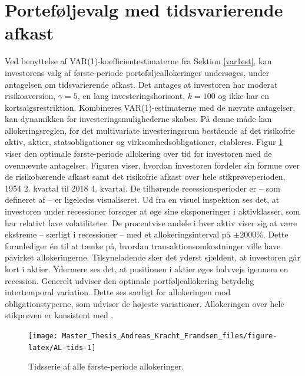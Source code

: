 \documentclass[
  a4paper,
  oneside]{memoir}
\begin{document}
\hypertarget{portvalgmedtids}{%
\section{Porteføljevalg med tidsvarierende afkast}\label{portvalgmedtids}}

Ved benyttelse af VAR(1)-koefficientestimaterne fra Sektion \ref{var1est}, kan investorens valg af første-periode porteføljeallokeringer undersøges, under antagelsen om tidsvarierende afkast. Det antages at investoren har moderat risikoaversion, \(\gamma=5\), en lang investeringshorisont, \(k=100\) og ikke har en kortsalgsrestriktion. Kombineres VAR(1)-estimaterne med de nævnte antagelser, kan dynamikken for investeringsmulighederne skabes. På denne måde kan allokeringsreglen, for det multivariate investeringsrum bestående af det risikofrie aktiv, aktier, statsobligationer og virksomhedsobligationer, etableres. Figur \ref{fig:AL-tids} viser den optimale første-periode allokering over tid for investoren med de ovennævnte antagelser. Figuren viser, hvordan investoren fordeler sin formue over de risikobærende afkast samt det risikofrie afkast over hele stikprøveperioden, 1954 2. kvartal til 2018 4. kvartal. De tilhørende recessionsperioder er -- som defineret af \citep{NBER2020} -- er ligeledes visualiseret. Ud fra en visuel inspektion ses det, at investoren under recessioner forsøger at øge sine eksponeringer i aktivklasser, som har relativt lave volatiliteter. De procentvise andele i hver aktiv viser sig at være ekstreme -- særligt i recessioner -- med et allokeringsinterval på \(\pm 2000\%\). Dette foranlediger én til at tænke på, hvordan transaktionsomkostninger ville have påvirket allokeringerne. Tilsyneladende sker det yderst sjældent, at investoren går kort i aktier. Ydermere ses det, at positionen i aktier øges halvvejs igennem en recession. Generelt udviser den optimale portføljeallokering betydelig intertemporal variation. Dette ses særligt for allokeringen mod obligationstyperne, som udviser de højeste variationer. Allokeringen over hele stikprøven er konsistent med \citep{JurVic2011}.

\begin{figure}[H]

{\centering \texttt{[image: Master\_Thesis\_Andreas\_Kracht\_Frandsen\_files/figure-latex/AL-tids-1]} 

}

\caption{Tidsserie af alle første-periode allokeringer.}\label{fig:AL-tids}
\end{figure}
\end{document}
